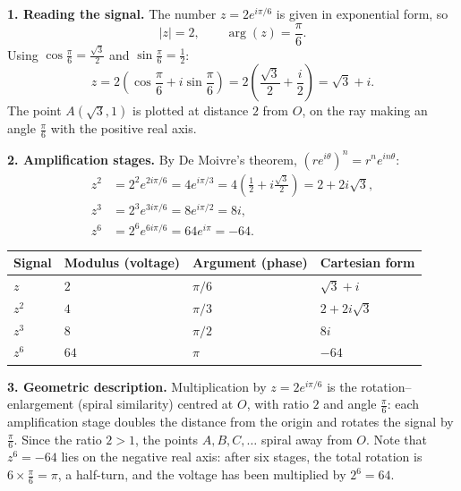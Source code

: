 \documentclass[11pt]{article}
\newcommand{\cle}[1]{{\popxbold\color{popdark}#1}}
\newcounter{popsec}
\newcounter{popsub}
\newcommand{\courssub}[1]{%
  \stepcounter{popsub}%
  \par\vspace{9pt}\noindent{\popxbold\fontsize{11.5}{13}\selectfont\color{popink}{\color{poporange}\thepopsec.\thepopsub}\hspace{6pt}#1}\par\nopagebreak\vspace{4pt}
}
\begin{document}
\courssub{Model answer}

\textbf{1. Reading the signal.} The number $z = 2e^{i\pi/6}$ is given in exponential form, so
\[
|z| = 2, \qquad \arg(z) = \frac{\pi}{6}.
\]
Using $\cos\frac{\pi}{6} = \frac{\sqrt{3}}{2}$ and $\sin\frac{\pi}{6} = \frac{1}{2}$:
\[
z = 2\left(\cos\frac{\pi}{6} + i\sin\frac{\pi}{6}\right) = 2\left(\frac{\sqrt{3}}{2} + \frac{i}{2}\right) = \sqrt{3} + i.
\]
The point $A(\sqrt{3}, 1)$ is plotted at distance $2$ from $O$, on the ray making an angle $\frac{\pi}{6}$ with the positive real axis.

\textbf{2. Amplification stages.} By De Moivre's theorem, $\left(re^{i\theta}\right)^{n} = r^{n}e^{in\theta}$:
\begin{align*}
z^{2} &= 2^{2}e^{2i\pi/6} = 4e^{i\pi/3} = 4\left(\tfrac{1}{2} + i\tfrac{\sqrt{3}}{2}\right) = 2 + 2i\sqrt{3},\\
z^{3} &= 2^{3}e^{3i\pi/6} = 8e^{i\pi/2} = 8i,\\
z^{6} &= 2^{6}e^{6i\pi/6} = 64e^{i\pi} = -64.
\end{align*}
\begin{center}
\begin{tabularx}{\linewidth}{|l|X|X|X|}
\hline
\rowcolor{popblueL} Signal & Modulus (voltage) & Argument (phase) & Cartesian form \\
\hline
$z$ & $2$ & $\pi/6$ & $\sqrt{3} + i$ \\
\hline
$z^{2}$ & $4$ & $\pi/3$ & $2 + 2i\sqrt{3}$ \\
\hline
$z^{3}$ & $8$ & $\pi/2$ & $8i$ \\
\hline
$z^{6}$ & $64$ & $\pi$ & $-64$ \\
\hline
\end{tabularx}
\end{center}

\textbf{3. Geometric description.} Multiplication by $z = 2e^{i\pi/6}$ is the \cle{rotation--enlargement} (spiral similarity) centred at $O$, with ratio $2$ and angle $\frac{\pi}{6}$: each amplification stage doubles the distance from the origin and rotates the signal by $\frac{\pi}{6}$. Since the ratio $2 > 1$, the points $A, B, C, \ldots$ spiral away from $O$. Note that $z^{6} = -64$ lies on the negative real axis: after six stages, the total rotation is $6 \times \frac{\pi}{6} = \pi$, a half-turn, and the voltage has been multiplied by $2^{6} = 64$.
\end{document}
